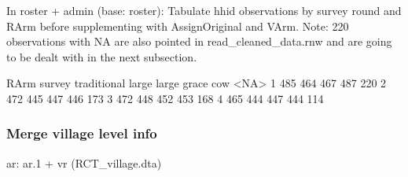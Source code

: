 In \textsf{roster + admin} (base: roster): Tabulate \textsf{hhid} observations by \textsf{survey} round and \textsf{RArm} before supplementing with \textsf{AssignOriginal} and \textsf{VArm}. Note: 220 observations with NA are also pointed in \textsf{read\_cleaned\_data.rnw} and are going to be dealt with in the next subsection.
\begin{Schunk}
\begin{Soutput}
      RArm
survey traditional large large grace cow <NA>
     1         485   464         467 487  220
     2         472   445         447 446  173
     3         472   448         452 453  168
     4         465   444         447 444  114
\end{Soutput}
\end{Schunk}

\subsubsection{Merge village level info}



\textsf{ar}: \textsf{ar.1} + \textsf{vr} (RCT\_village.dta)

